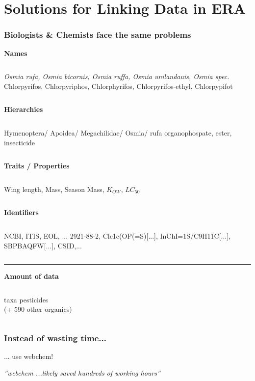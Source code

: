 \documentclass[10pt
	]{beamer}
\begin{document}
\section{Solutions for Linking Data in ERA}

\begin{frame}
\frametitle{Biologists \& Chemists face the same problems}
	\small
	\centering
	\textbf{\alert{Names}}
	\begin{columns}[t]
	\emph{Osmia rufa, Osmia bicornis, Osmia ruffa, Osmia unilandauis, Osmia spec.} 
	Chlorpyrifos, Chlorpyriphos, Chlorphyrifos, Chlorpyrifos-ethyl, Chlorpypifot
	\end{columns}
	\pause

	\centering
	\textbf{\alert{Hierarchies}}
	\begin{columns}[t]
	Hymenoptera/ Apoidea/ Megachilidae/ Osmia/ rufa 
	organophospate, ester, insecticide
	\end{columns}
	\pause

	\centering
	\textbf{\alert{Traits / Properties}}
	\begin{columns}[t]
	Wing length, Mass, Season 
	Mass, $K_{OW}$, $LC_{50}$
	\end{columns}
	\pause

	\centering
	\textbf{\alert{Identifiers}}
	\begin{columns}[t]
	NCBI, ITIS, EOL, ... 
	2921-88-2, Clc1c(OP(=S)[...], InChI=1S/C9H11C[...], SBPBAQFW[...], CSID,...
	\end{columns}
	\vspace{0.8em}
	\pause

	\rule{\textwidth}{1pt}
	\textbf{\alert{Amount of data}}

	\begin{columns}[t]
	 taxa
	 pesticides \\ (+ 590 other organics)
	\end{columns}
\end{frame}


{%
\begin{frame}{}
\frametitle{Instead of wasting time...}
... use \alert{webchem}! \\
	\hspace*{-2cm}
	\begin{adjustbox}{max totalsize={1.1\textwidth}{1.1\textheight}}
				
	\end{adjustbox}

\vspace*{-1cm}\emph{''\alert{webchem} ...likely saved hundreds of working hours''}
\end{frame}
}
\end{document}
